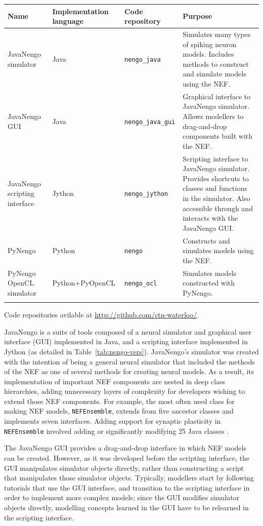 \documentclass{frontiersSCNS}
\begin{document}
\begin{table}[!t]
{\begin{tabular}{p{2.6cm} p{2.7cm} l p{7cm}} \toprule
\textbf{Name} & \textbf{Implementation language}
  & \textbf{Code repository} & \textbf{Purpose} \\\midrule
JavaNengo simulator & Java & \texttt{nengo\_java}
  & Simulates many types of spiking neuron models.
  Includes methods to construct and simulate models using the NEF. \\
JavaNengo GUI & Java & \texttt{nengo\_java\_gui}
  & Graphical interface to JavaNengo simulator.
  Allows modellers to drag-and-drop components built with the NEF. \\
JavaNengo scripting interface & Jython & \texttt{nengo\_jython}
  & Scripting interface to JavaNengo simulator.
  Provides shortcuts to classes and functions in the simulator.
  Also accessible through and interacts with the JavaNengo GUI. \\
PyNengo & Python & \texttt{nengo}
  & Constructs and simulates models using the NEF. \\
PyNengo OpenCL simulator & Python+PyOpenCL
  & \texttt{nengo\_ocl}
  & Simulates models constructed with PyNengo. \\\botrule
\end{tabular}}{Code repositories avilable at \url{http://github.com/ctn-waterloo/}.}
\end{table}

JavaNengo is a suite of tools composed of
a neural simulator and graphical user interface (GUI)
implemented in Java,
and a scripting interface implemented in Jython
(as detailed in Table~\ref{tab:nengo-vers}).
JavaNengo's simulator was created
with the intention of being a general
neural simulator that included
the methods of the NEF
as one of several
methods for creating neural models.
As a result, its implementation
of important NEF components
are nested in deep class hierarchies,
adding unnecessary layers of complexity
for developers wishing
to extend those NEF components.
For example,
the most often used class for making
NEF models, \texttt{NEFEnsemble},
extends from five ancestor classes
and implements seven interfaces.
Adding support for synaptic plasticity
in \texttt{NEFEnsemble}
involved adding or significantly modifying
25 Java classes \citep{bekolay2010}.

The JavaNengo GUI provides
a drag-and-drop interface in which
NEF models can be created.
However, as it was developed
before the scripting interface,
the GUI manipulates simulator objects directly,
rather than constructing a script
that manipulates those simulator objects.
Typically, modellers start by following
tutorials that use the GUI interface,
and transition to the scripting interface
in order to implement more complex models;
since the GUI modifies simulator objects directly,
modelling concepts learned in the GUI
have to be relearned in the scripting interface.
\end{document}
